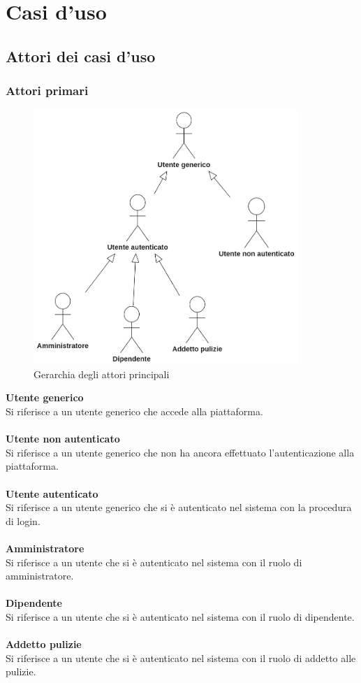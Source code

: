 \section{Casi d'uso}

\subsection{Attori dei casi d'uso}

\subsubsection{Attori primari}
\begin{figure}[H]
		\centering
		\includegraphics[width=10cm]{res/images/utentigenerali.png}
		\caption{Gerarchia degli attori principali}
		\label{fig:Gerarchia attori principali}
	\end{figure}

\textbf{Utente generico}\\
Si riferisce a un utente generico che accede alla piattaforma.\\
\\
\textbf{Utente non autenticato}\\
Si riferisce a un utente generico che non ha ancora effettuato l’autenticazione alla piattaforma.\\
\\
\textbf{Utente autenticato}\\
Si riferisce a un utente generico che si è autenticato nel sistema con la procedura di login.\\
\\
\textbf{Amministratore}\\
Si riferisce a un utente che si è autenticato nel sistema con il ruolo di amministratore.\\
\\
\textbf{Dipendente}\\
Si riferisce a un utente che si è autenticato nel sistema con il ruolo di dipendente.\\
\\
\textbf{Addetto pulizie}\\
Si riferisce a un utente che si è autenticato nel sistema con il ruolo di addetto alle pulizie.\\

